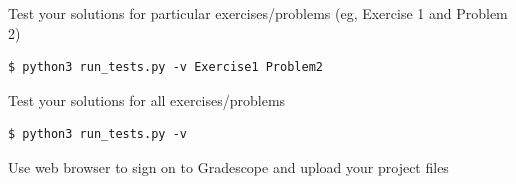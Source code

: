 \documentclass[8pt,a4paper,compress]{beamer}
\newlength{\myMheight}
\begin{document}
\begin{frame}[fragile]
\pause\transdissolve

Test your solutions for particular exercises/problems (eg, Exercise 1 and Problem 2)

\begin{tcolorbox}[enhanced,drop shadow southwest,sharp corners,size=fbox,colback=black]
\begin{lstlisting}[style=terminal]
$ python3 run_tests.py -v Exercise1 Problem2
\end{lstlisting}
\end{tcolorbox}

\pause\transdissolve\bigskip

Test your solutions for all exercises/problems

\begin{tcolorbox}[enhanced,drop shadow southwest,sharp corners,size=fbox,colback=black]
\begin{lstlisting}[style=terminal]
$ python3 run_tests.py -v
\end{lstlisting}
\end{tcolorbox}

\pause\transdissolve\bigskip

Use web browser  to sign on to Gradescope and upload your project files
\end{frame}
\end{document}
